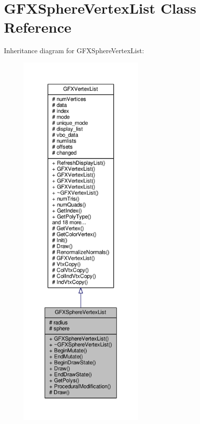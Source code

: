 \hypertarget{classGFXSphereVertexList}{}\section{G\+F\+X\+Sphere\+Vertex\+List Class Reference}
\label{classGFXSphereVertexList}


Inheritance diagram for G\+F\+X\+Sphere\+Vertex\+List\+:
\nopagebreak
\begin{figure}[H]
\begin{center}
\leavevmode
\includegraphics[height=550pt]{d2/d9a/classGFXSphereVertexList__inherit__graph}
\end{center}
\end{figure}


